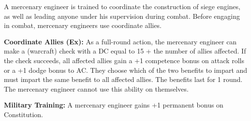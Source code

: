 A mercenary engineer is trained to coordinate the construction of siege engines, as well as leading anyone under his supervision during combat. Before engaging in combat, mercenary engineers use coordinate allies.

\textbf{Coordinate Allies (Ex):} As a full-round action, the mercenary engineer can make a  (warcraft) check with a DC equal to 15 + the number of allies affected. If the check succeeds, all affected allies gain a +1 competence bonus on attack rolls or a +1 dodge bonus to AC. They choose which of the two benefits to impart and must impart the same benefit to all affected allies. The benefits last for 1 round. The mercenary engineer cannot use this ability on themselves.

\textbf{Military Training:} A mercenary engineer gains +1 permanent bonus on Constitution.

